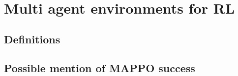 \chapter{Multi agent environments for RL}

\section{Definitions}

\section{Possible mention of MAPPO success}

